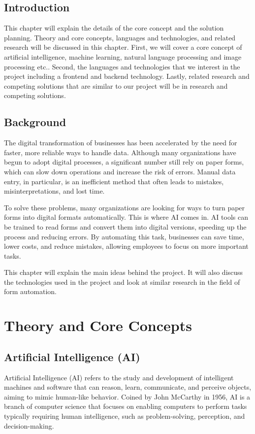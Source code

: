 \documentclass[12pt,oneside,openright,a4paper]{cpe-english-project}
\begin{document}
\subsection{Introduction}
This chapter will explain the details of the core concept and the solution planning. Theory and core concepts, languages and technologies, and related research will be discussed in this chapter. First, we will cover a core concept of artificial intelligence, machine learning, natural language processing and image processing etc.. Second, the languages and technologies that we interest in the project including a frontend and backend technology. Lastly, related research and competing solutions that are similar to our project will be in research and competing solutions.

\subsection{Background}
The digital transformation of businesses has been accelerated by the need for faster, more reliable ways to handle data. Although many organizations have begun to adopt digital processes, a significant number still rely on paper forms, which can slow down operations and increase the risk of errors. Manual data entry, in particular, is an inefficient method that often leads to mistakes, misinterpretations, and lost time. \par
To solve these problems, many organizations are looking for ways to turn paper forms into digital formats automatically. This is where AI comes in. AI tools can be trained to read forms and convert them into digital versions, speeding up the process and reducing errors. By automating this task, businesses can save time, lower costs, and reduce mistakes, allowing employees to focus on more important tasks.\par
This chapter will explain the main ideas behind the project. It will also discuss the technologies used in the project and look at similar research in the field of form automation.

\section{Theory and Core Concepts}
\subsection{Artificial Intelligence (AI)}
Artificial Intelligence (AI) refers to the study and development of intelligent machines and software that can reason, learn, communicate, and perceive objects, aiming to mimic human-like behavior. Coined by John McCarthy in 1956, AI is a branch of computer science that focuses on enabling computers to perform tasks typically requiring human intelligence, such as problem-solving, perception, and decision-making.
\end{document}
